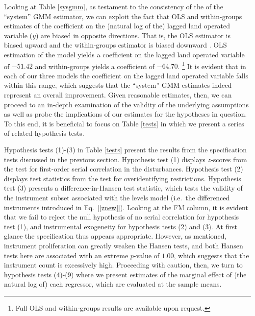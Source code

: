 \documentclass[english]{article}
\begin{document}
 Looking at Table \ref{sysgmm}, as testament to the consistency of the
 of the ``system'' GMM estimator, we can exploit the fact that OLS and 
 within-groups estimates of the coefficient on the (natural log of the) lagged 
 land operated variable ($y$) are biased in opposite directions. 
 That is, the OLS estimator is biased upward and the within-groups estimator
 is biased downward \citep{bond2002}.
 OLS estimation of the model yields a coefficient on the lagged land operated 
 variable of $-51.42$ and within-groups yields a coefficient of $-64.70$.%
 \footnote{Full OLS and within-groups results are available upon request.}
 It is evident that in each of our three models the coefficient on the lagged
 land operated variable falls within this range, which suggests that the 
 ``system'' GMM estimates indeed represent an overall improvement.
 Given reasonable estimates, then, we can proceed to an in-depth 
 examination of the validity of the underlying assumptions as well as probe
 the implications of our estimates for the hypotheses in question.
 To this end, it is beneficial to focus on Table \ref{tests} in which we 
 present a series of related hypothesis tests.
 
Hypothesis tests (1)-(3) in Table \ref{tests} present the results from the 
specification tests discussed in the previous section. 
Hypothesis test (1) displays $z$-scores from the \citet{arellano1991} test 
for first-order serial correlation in the disturbances.
Hypothesis test (2) displays test statistics from the \citet{hansen1982} 
test for overidentifying restrictions.
Hypothesis test (3) presents a difference-in-Hansen test statistic, which 
tests the validity of the instrument subset associated with the levels model
(i.e.\ the differenced instruments introduced in Eq.\ [\ref{znew}]).
Looking at the FM column, it is evident that we fail to reject the null 
hypothesis of no serial correlation for hypothesis test (1), and instrumental
exogeneity for hypothesis tests (2) and (3).
At first glance the specification thus appears appropriate.
However, as mentioned, instrument proliferation can greatly weaken the 
Hansen tests, and both Hansen tests here are associated with an extreme 
$p$-value of $1.00$, which suggests that the instrument count is excessively 
high. 
Proceeding with caution, then, we turn to hypothesis tests (4)-(9) where we 
present estimates of the marginal effect of (the natural log of) each regressor, 
which are evaluated at the sample means.
\end{document}
